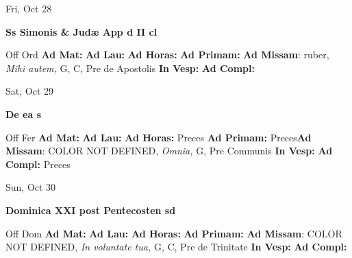 \documentclass[10pt]{memoir}
\begin{document}
\begin{center}
\begin{minipage}{3.5in}
\vspace{2em}
\begin{center}Fri, Oct 28
\end{center}
\textbf{ \large Ss Simonis \& Judæ App
\textnormal{\normalsize d II cl}}

\begin{justify}Off Ord
\textbf{Ad Mat: }
\textbf{Ad Lau: }
\textbf{Ad Horas: }
\textbf{Ad Primam: }\textbf{Ad Missam}: ruber, \textit{Mihi autem,} G, C, Pre de Apostolis
\textbf{In Vesp: }
\textbf{Ad Compl: }
\end{justify}
\end{minipage}
\end{center}

\begin{center}
\begin{minipage}{3.5in}
\vspace{2em}
\begin{center}Sat, Oct 29
\end{center}
\textbf{ \large De ea
\textnormal{\normalsize s}}

\begin{justify}Off Fer
\textbf{Ad Mat: }
\textbf{Ad Lau: }
\textbf{Ad Horas: }Preces
\textbf{Ad Primam: }Preces\textbf{Ad Missam}: COLOR NOT DEFINED, \textit{Omnia,} G, Pre Communis
\textbf{In Vesp: }
\textbf{Ad Compl: }Preces
\end{justify}
\end{minipage}
\end{center}

\begin{center}
\begin{minipage}{3.5in}
\vspace{2em}
\begin{center}Sun, Oct 30
\end{center}
\textbf{ \large Dominica XXI post Pentecosten
\textnormal{\normalsize sd}}

\begin{justify}Off Dom
\textbf{Ad Mat: }
\textbf{Ad Lau: }
\textbf{Ad Horas: }
\textbf{Ad Primam: }\textbf{Ad Missam}: COLOR NOT DEFINED, \textit{In voluntate tua,} G, C, Pre de Trinitate
\textbf{In Vesp: }
\textbf{Ad Compl: }
\end{justify}
\end{minipage}
\end{center}
\end{document}
